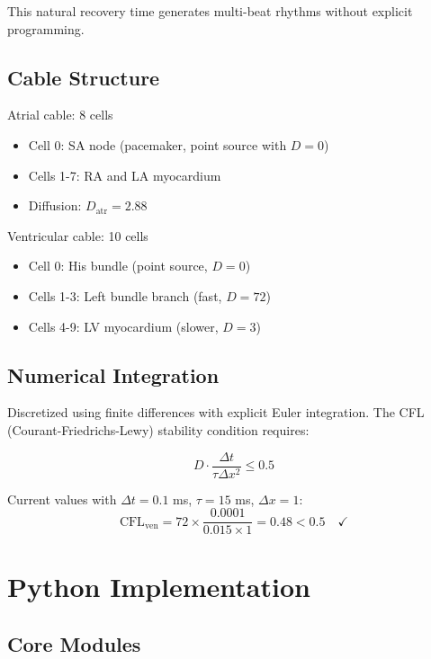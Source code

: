 \documentclass[12pt,a4paper]{article}
\begin{document}
This natural recovery time generates multi-beat rhythms without explicit programming.

\subsection*{Cable Structure}

Atrial cable: 8 cells
\begin{itemize}
\item Cell 0: SA node (pacemaker, point source with $D=0$)
\item Cells 1-7: RA and LA myocardium
\item Diffusion: $D_{\text{atr}} = 2.88$
\end{itemize}

Ventricular cable: 10 cells
\begin{itemize}
\item Cell 0: His bundle (point source, $D=0$)
\item Cells 1-3: Left bundle branch (fast, $D=72$)
\item Cells 4-9: LV myocardium (slower, $D=3$)
\end{itemize}

\subsection*{Numerical Integration}

Discretized using finite differences with explicit Euler integration. The CFL (Courant-Friedrichs-Lewy) stability condition requires:

$$D \cdot \frac{\Delta t}{\tau \Delta x^2} \le 0.5$$

Current values with $\Delta t = 0.1$ ms, $\tau = 15$ ms, $\Delta x = 1$:
$$\text{CFL}_{\text{ven}} = 72 \times \frac{0.0001}{0.015 \times 1} = 0.48 < 0.5 \quad \checkmark$$

\section*{Python Implementation}

\subsection*{Core Modules}
\end{document}
